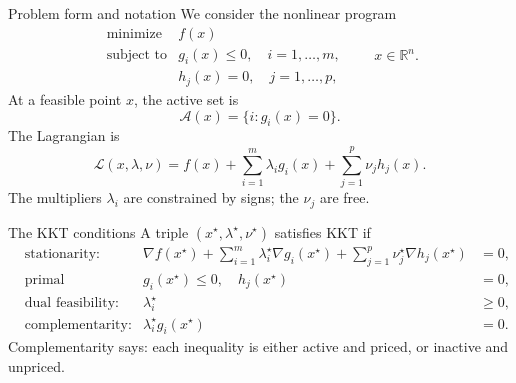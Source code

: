 \documentclass[aspectratio=169]{beamer}
\newcommand{\R}{\mathbb{R}}
\newcommand{\Lagr}{\mathcal{L}}
\newcommand{\act}{\mathcal{A}}
\begin{document}
\begin{frame}{Problem form and notation}
  We consider the nonlinear program
  \[
    \begin{array}{ll}
      \text{minimize} & f(x) \\
      \text{subject to} & g_i(x)\le 0,\quad i=1,\ldots,m,\\
                        & h_j(x)=0,\quad j=1,\ldots,p,
    \end{array}
    \qquad x\in\R^n .
  \]
  \vspace{.3em}
  At a feasible point $x$, the active set is
  \[
    \act(x)=\{i: g_i(x)=0\}.
  \]
  \vspace{.3em}
  The Lagrangian is
  \[
    \Lagr(x,\lambda,\nu)=f(x)+\sum_{i=1}^m\lambda_i g_i(x)+\sum_{j=1}^p\nu_j h_j(x).
  \]
  The multipliers $\lambda_i$ are constrained by signs; the $\nu_j$ are free.
\end{frame}

\begin{frame}{The KKT conditions}
  A triple $(x^\star,\lambda^\star,\nu^\star)$ satisfies KKT if
  \begin{align*}
    &\text{stationarity:} &
      \nabla f(x^\star)+\sum_{i=1}^m\lambda_i^\star\nabla g_i(x^\star)+\sum_{j=1}^p\nu_j^\star\nabla h_j(x^\star)&=0,\\
    &\text{primal feasibility:} &
      g_i(x^\star)\le 0,\quad h_j(x^\star)&=0,\\
    &\text{dual feasibility:} &
      \lambda_i^\star&\ge 0,\\
    &\text{complementarity:} &
      \lambda_i^\star g_i(x^\star)&=0.
  \end{align*}
  \vspace{.4em}
  Complementarity says: each inequality is either active and priced, or inactive and unpriced.
\end{frame}
\end{document}
